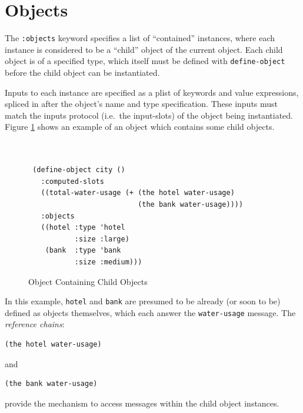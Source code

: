 \documentclass [11pt]{book}
\begin{document}
\section{Objects}

\label{sec:objects}

The \texttt{:objects} keyword specifies a list of ``contained'' instances,
where each instance is considered to be a ``child'' object of the current
object. Each child object is of a specified type, which itself must be defined
with \texttt{define-object} before the child object can be instantiated.

Inputs to each instance are specified as a plist of keywords and
value expressions, spliced in after the object's name and type
specification. These inputs must match the inputs protocol (i.e.\ the input-slots)
of the object being instantiated. Figure 
\ref{fig:object-city} shows an example of an object which contains some child objects.
\begin{figure}
\begin{lrbox}{\boxedverb}
\begin{minipage}{\linewidth}

\begin{verbatim}


 (define-object city ()
   :computed-slots
   ((total-water-usage (+ (the hotel water-usage)
                          (the bank water-usage))))
   :objects
   ((hotel :type 'hotel
           :size :large)
    (bank  :type 'bank
           :size :medium)))

\end{verbatim}
\end{minipage}
\end{lrbox}
\fbox{\usebox{\boxedverb}}

\caption{Object Containing Child Objects}

\label{fig:object-city}

\end{figure}
In this example, \texttt{hotel} and \texttt{bank} are presumed to be already (or soon to be) defined as objects themselves, 
which each answer the \texttt{water-usage} message. The \emph{reference chains}:

\begin{verbatim}(the hotel water-usage)
\end{verbatim} and 

\begin{verbatim}(the bank water-usage)
\end{verbatim} provide the mechanism to access messages within the child object instances.
\end{document}
